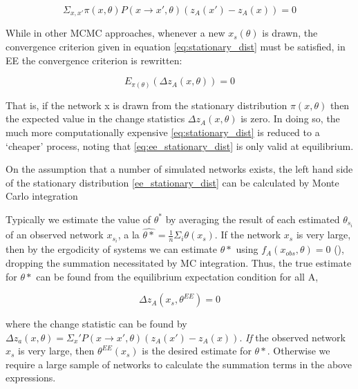 \begin{equation}
\label{eq:stationary_dist}
\Sigma_{x,x'}\pi(x, \theta)P(x \rightarrow x', \theta)(z_A(x') - z_A(x)) = 0
\end{equation}

While in other MCMC approaches, whenever a new $x_s(\theta)$ is drawn, the convergence criterion given in equation \ref{eq:stationary_dist} must be satisfied, in EE the convergence criterion is rewritten:

\begin{equation}
\label{eq:ee_stationary_dist}
E_{\pi(\theta)}(\Delta z_A(x, \theta)) = 0
\end{equation}

That is, if the network x is drawn from the stationary distribution $\pi(x,\theta)$ then the expected value in the change statistics $\Delta z_A(x,\theta)$ is zero. In doing so, the much more computationally expensive \ref{eq:stationary_dist} is reduced to a `cheaper' process, noting that \ref{eq:ee_stationary_dist} is only valid at equilibrium. 

On the assumption that a number of simulated networks exists, the left hand side of the stationary distribution \ref{ee_stationary_dist} can be calculated by Monte Carlo integration


Typically we estimate the value of $\theta^*$ by averaging the result of each estimated $\theta_{s_{i}}$ of an observed network $x_{s_{i}}$, a la $\hat{\theta*} = \frac{1}{n}\Sigma_i \theta(x_s)$. If the network $x_s$ is very large, then by the ergodicity of systems we can estimate $\theta*$ using $f_A(x_{obs}, \theta) = 0$ (\cite{stivala2018}), dropping the summation necessitated by MC integration. Thus, the true estimate for $\theta*$ can be found from the equilibrium expectation condition for all A,

\begin{equation}
\label{eq:ee}
\Delta z_A(x_s, \theta^{EE}) = 0 
\end{equation}

where the change statistic can be found by $\Delta z_a(x, \theta) = \Sigma_x' P(x \rightarrow x', \theta) (z_A(x') - z_A(x))$. \textit{If} the observed network $x_s$ is very large, then $\theta^{EE}(x_s)$ is the desired estimate for $\theta*$. Otherwise we require a large sample of networks to calculate the summation terms in the above expressions. 


